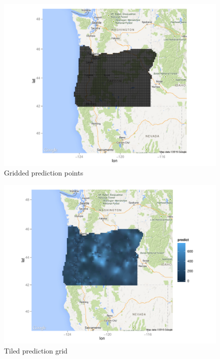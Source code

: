 \documentclass[12pt,twoside]{reedthesis}
\begin{document}
 
 \begin{figure}[h]
	   
	       \centering
	  
	    \includegraphics[scale=0.5]{pred_points}
	
	     \caption{Gridded prediction points}
	 \label{grid}
	\end{figure}
 
\begin{figure}[h]
	   
	       \centering
	  
	    \includegraphics[scale=0.5]{tileplot}
	
	     \caption{Tiled prediction grid}
	 \label{tile}
	\end{figure}
	
\end{document}

